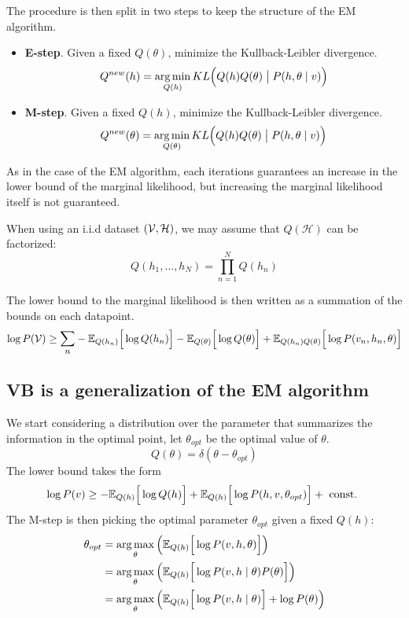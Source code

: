 The procedure is then split in two steps to keep the structure of the EM algorithm.

\begin{itemize}
  \item \textbf{E-step}. Given a fixed \(Q(\theta)\), minimize the Kullback-Leibler divergence.
    \[
    Q^{new}(h) = \operatorname*{arg\,min}_{Q(h)}KL\Big(Q(h)Q(\theta) \bigm| P(h,\theta \mid v)\Big)
    \]

  \item \textbf{M-step}. Given a fixed \(Q(h)\), minimize the Kullback-Leibler divergence.
    \[
    Q^{new}(\theta) = \operatorname*{arg\,min}_{Q(\theta)}KL\Big(Q(h)Q(\theta) \bigm| P(h,\theta \mid v)\Big)
    \]
\end{itemize}

As in the case of the EM algorithm, each iterations guarantees an increase in the lower bound of the marginal likelihood, but increasing the marginal likelihood itself is not guaranteed.

When using an i.i.d dataset \((\mathcal{V}, \mathcal{H})\), we may assume that \(Q(\mathcal{H})\) can be factorized:
\[
  Q(h_{1}, \dots, h_{N}) = \prod_{n=1}^{N}Q(h_{n})
\]

The lower bound to the marginal likelihood is then written as a summation of the bounds on each datapoint.
\[
  \log{P(\V)} \geq \mathlarger{\sum_{n}} -\E{Q(h_{n})}{\log{Q(h_{n})}}- \E{Q(\theta)}{\log{Q(\theta)}} + \E{Q(h_{n})Q(\theta)}{\log{P(v_{n}, h_{n},\theta)}}
\]

\subsection{VB is a generalization of the EM algorithm}

We start considering a distribution over the parameter that summarizes the information in the optimal point, let \(\theta_{opt}\) be the optimal value of \(\theta\).
\[
  Q(\theta) = \delta(\theta - \theta_{opt})
\]
The lower bound takes the form
\[
  \log{P(v)} \geq - \mathbb{E}_{Q(h)}\Big[\log{Q(h)}\Big] + \mathbb{E}_{Q(h)}\Big[\log{P(h, v, \theta_{opt})}\Big] + \text{ const. }
\]
The M-step is then picking the optimal parameter \(\theta_{opt}\) given a fixed \(Q(h)\):
\[
  \begin{aligned}
    \theta_{opt} &= \operatorname*{arg\,max}_{\theta} \Big( \mathbb{E}_{Q(h)}\Big[\log{P(v,h,\theta)}\Big] \Big)\\
    &=  \operatorname*{arg\,max}_{\theta} \Big( \mathbb{E}_{Q(h)}\Big[\log{P(v, h \mid \theta)P(\theta)}\Big] \Big) \\
    &= \operatorname*{arg\,max}_{\theta} \Big( \mathbb{E}_{Q(h)}\Big[\log{P(v,h \mid\theta)}\Big] + \log{P(\theta)} \Big) \\
  \end{aligned}
\]

